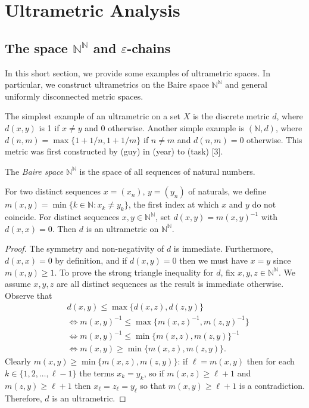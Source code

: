 \section{Ultrametric Analysis}
\subsection{The space \( \mathbb{N} ^{\mathbb{N} } \) and \( \varepsilon  \)-chains} In this short section, we provide some examples of ultrametric spaces. In particular, we construct ultrametrics on the Baire space $\mathbb{N} ^{\mathbb{N} } $ and general uniformly disconnected metric spaces.

The simplest example of an ultrametric on a set $X$ is the discrete metric $d$, where $d(x,y)$ is 1 if $x \neq y$ and 0 otherwise. Another simple example is $(\mathbb{N}, d)$, where \( d(n,m) = \max \{ 1 + 1/n , 1 + 1/m \}  \) if \( n \neq m \) and \( d(n, m) = 0 \) otherwise. This metric was first constructed by (guy) in (year) to (task) [3].

The \emph{Baire space} \( \mathbb{N} ^{\mathbb{N} }  \) is the space of all sequences of natural numbers.
\begin{example}
For two distinct sequences \( x =  (x_{n}) \), \( y = (y_{n} ) \) of naturals, we define \( m(x,y) = \min \{ k \in \mathbb{N} : x_{k} \neq y_{k}  \}  \), the first index at which \( x \) and \( y \) do not coincide. For distinct sequences \( x,y \in \mathbb{N} ^{\mathbb{N} }  \), set \( d(x,y) = m(x,y)^{-1}  \) with \( d(x,x) = 0 \). Then \( d \) is an ultrametric on \( \mathbb{N} ^{\mathbb{N} }  \).
\end{example}
\begin{proof}
The symmetry and non-negativity of \( d \) is immediate. Furthermore, \( d(x,x) = 0 \) by definition, and if \( d(x,y) = 0  \) then we must have \( x = y \) since \( m(x,y) \geq 1 \). To prove the strong triangle inequality for \( d \), fix \( x,y,z \in \mathbb{N} ^{\mathbb{N} }  \). We assume \( x,y,z \) are all distinct sequences as the result is immediate otherwise. Observe that
\begin{align*}
	&d(x,y) \leq \max \{ d(x,z), d(z,y) \} \\
	&\Leftrightarrow m(x,y)^{-1} \leq \max \{ m(x,z)^{-1} , m(z,y)^{-1}  \}  \\
	&\Leftrightarrow m(x,y)^{-1}  \leq \min \{ m(x,z), m(z,y) \} ^{-1} \\
	&\Leftrightarrow m(x,y) \geq \min \{ m(x,z), m(z,y) \}.
\end{align*}
Clearly \( m(x,y) \geq \min \{ m(x,z), m(z,y) \}  \): if \( \ell = m(x,y) \) then for each \( k \in \{ 1, 2, \hdots , \ell - 1 \} \) the terms \( x_{k} = y_{k}  \), so if \( m(x,z) \geq \ell + 1 \) and \( m(z,y) \geq \ell + 1 \) then \( x_{\ell} = z_{\ell} = y_{\ell}   \) so that \( m(x,y) \geq \ell + 1 \) is a contradiction. Therefore, \( d \) is an ultrametric.
\end{proof}

